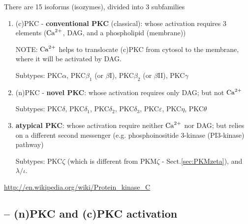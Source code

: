 There are 15 isoforms (isozymes), divided into 3 subfamilies
\begin{enumerate}

  \item (c)PKC - {\bf conventional PKC} (classical): whose activation requires 3
  elements (${\text{Ca}^{2+}}$, DAG, and a phospholipid (membrane))

NOTE: ${\text{Ca}^{2+}}$ helps to translocate (c)PKC from cytosol to the membrane, where it
will be activated by DAG.
  
Subtypes: PKC$\alpha$, PKC$\beta_1$ (or $\beta$I), PKC$\beta_2$ (or $\beta$II),
 PKC$\gamma$
  
  \item (n)PKC - {\bf novel PKC}: whose activation requires only DAG; but not
  ${\text{Ca}^{2+}}$
  
Subtypes: PKC$\delta$, PKC$\delta_1$, PKC$\delta_2$, PKC$\delta_3$, 
 PKC$\varepsilon$, PKC$\eta$, PKC$\theta$ 
  
  \item {\bf atypical PKC}: whose activation require neither ${\text{Ca}^{2+}}$ nor DAG;
  but relies on a different second messenger (e.g. phosphoinositide 3-kinase
  (PI3-kinase) pathway)
  
Subtypes: PKC$\zeta$ (which is different from PKM$\zeta$
 - Sect.\ref{sec:PKMzeta}), and $\lambda/\iota$. 
  
\end{enumerate}
\url{http://en.wikipedia.org/wiki/Protein_kinase_C}


\subsection{-- (n)PKC and (c)PKC activation}
\label{sec:PKC-activation}

